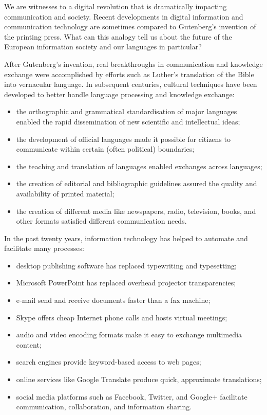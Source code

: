 \documentclass[]{../../metanetpaper}
\begin{document}
\begin{multicols}{2}

We are witnesses to a digital revolution that is dramatically impacting
communication and society. Recent developments in digital information and
communication technology are sometimes compared to Gutenberg's invention of
the printing press. What can this analogy tell us about the future of the
European information society and our languages in particular?



After Gutenberg's invention, real breakthroughs in communication and
knowledge exchange were accomplished by efforts such as Luther's translation
of the Bible into vernacular language. In subsequent centuries, cultural
techniques have been developed to better handle language processing and
knowledge exchange:

\begin{itemize}
\item the orthographic and grammatical standardisation of major languages enabled
the rapid dissemination of new scientific and intellectual ideas;
\item the development of official languages made it possible for citizens to
 communicate within certain (often political) boundaries;
\item the teaching and translation of languages enabled exchanges across languages;
\item the creation of editorial and bibliographic guidelines assured the quality and
availability of printed material;
\item the creation of different media like newspapers, radio, television, books,
 and other formats satisfied different communication needs. 
\end{itemize}


In the past twenty years, information technology has helped to automate and facilitate many processes:
\begin{itemize}
\item desktop publishing software has replaced typewriting and typesetting;
\item Microsoft PowerPoint has replaced overhead projector transparencies;
\item e-mail send and receive documents faster than a fax machine;
\item Skype offers cheap Internet phone calls and hosts virtual meetings;
\item audio and video encoding formats make it easy to exchange multimedia
  content;
\item search engines provide keyword-based access to web pages;
\item online services like Google Translate produce quick, approximate
  translations;
\item social media platforms such as Facebook, Twitter, and Google+ facilitate
  communication, collaboration, and information sharing.
\end{itemize}



\end{multicols}
\end{document}
